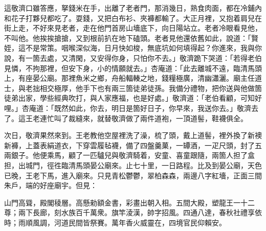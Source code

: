 這敬濟口雖答應，拏錢米在手，出離了老者門，那消幾日，熟食肉面，都在冷鋪內和花子打夥兒都吃了。耍錢，又把白布衫、夾褲都輸了。大正月裡，又抱着肩兒在街上走，不好來見老者，走在他門首房山墻底下，向日陽站立。老者冷眼看見他，不叫他。他挨挨搶搶，又到根前扒在地下磕頭。{}老者見他還依舊如此，說道：「賢姪，這不是常策。咽喉深似海，日月快如梭，無底坑如何填得起？你進來，我與你說，有一箇去處，又清閑，又安得你身，只怕你不去。」敬濟跪下哭道：「若得老伯見憐，不拘那裡，但安下身，小的情願就去。」杏庵道：「此去離城不遠，臨清馬頭上，有座晏公廟。那裡魚米之鄉，舟船輻輳之地，錢糧極廣，清幽瀟灑。廟主任道士，與老拙相交極厚，他手下也有兩三箇徒弟徒孫。我備分禮物，把你送與他做箇徒弟出家，學些經典吹打，與人家應福，也是好處。」敬濟道：「老伯看顧，可知好哩。」杏庵道：「既然如此，你去，明日是箇好日子，你早來，我送你去。」敬濟去了。這王老連忙叫了裁縫來，就替敬濟做了兩件道袍，一頂道髻，鞋襪俱全。

次日，敬濟果然來到。王老教他空屋裡洗了澡，梳了頭，戴上道髻，裡外換了新襖新褲，上蓋表絹道衣，下穿雲履毡襪，備了四盤羹菓，一罈酒，一疋尺頭，封了五兩銀子。他便乘馬，顧了一匹驢兒與敬濟騎着，安童、喜童跟隨，兩箇人担了盒担，出城門，徑徃臨清馬頭晏公廟來。止七十里，一日路程。比及到晏公廟，天色已晚，王老下馬，進入廟來。只見青松鬱鬱，翠柏森森，兩邊八字紅墻，正面三間朱戶，端的好座廟宇。但見：

山門高聳，殿閣稜層。高懸勑額金書，彩畫出朝入相。{}五間大殿，塑龍王一十二尊；兩下長廊，刻水族百千萬衆。旗竿淩漢，帥字招風。四通八達，春秋社禮享依時；雨順風調，河道民間皆祭賽。萬年香火威靈在，四境官民仰賴安。

